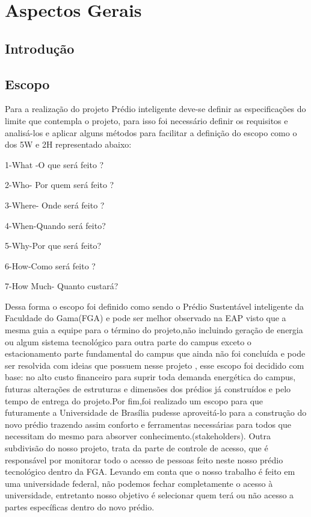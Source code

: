 \part{Aspectos Gerais}
\chapter[Introdução]{Introdução}


\chapter{Escopo}
Para a realização do projeto Prédio inteligente deve-se definir as especificações do limite que contempla o projeto, para isso foi necessário definir os requisitos e analisá-los e aplicar alguns métodos para facilitar a definição do escopo como o dos 5W e 2H representado abaixo:

1-What -O que será feito ?

2-Who- Por quem será feito ?

3-Where- Onde será feito ?

4-When-Quando será feito?

5-Why-Por que será feito?

6-How-Como será feito ?

7-How Much- Quanto custará?

    Dessa forma o escopo foi definido como sendo o Prédio Sustentável inteligente da Faculdade do Gama(FGA) e pode ser melhor observado na EAP visto que a mesma guia a equipe para o término do projeto,não incluindo geração de energia ou algum sistema tecnológico para outra parte do campus exceto o estacionamento parte fundamental do campus que ainda não foi concluída e pode ser resolvida com ideias que possuem nesse projeto , esse escopo foi decidido com base: no  alto custo financeiro para suprir toda demanda energética do campus, futuras alterações de estruturas e dimensões dos prédios já construídos e pelo tempo de entrega do projeto.Por fim,foi realizado um escopo para que futuramente a Universidade de Brasília pudesse aproveitá-lo para a construção do novo prédio trazendo assim conforto e ferramentas necessárias para todos que necessitam do mesmo para absorver conhecimento.(stakeholders).
    Outra subdivisão do nosso projeto, trata da parte de controle de acesso, que é responsável por monitorar todo o acesso de pessoas feito neste nosso prédio tecnológico dentro da FGA. Levando em conta que o nosso trabalho é feito em uma universidade federal, não podemos fechar completamente o acesso à universidade, entretanto nosso objetivo é selecionar quem terá ou não acesso a partes específicas dentro do novo prédio.

